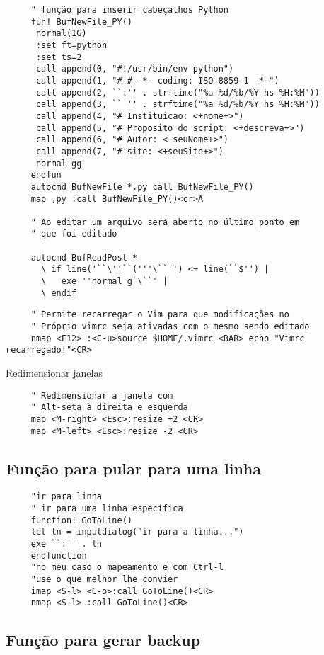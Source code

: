 \begin{verbatim}
     " função para inserir cabeçalhos Python
     fun! BufNewFile_PY()
      normal(1G)
      :set ft=python
      :set ts=2
      call append(0, "#!/usr/bin/env python")
      call append(1, "# # -*- coding: ISO-8859-1 -*-")
      call append(2, ``:'' . strftime("%a %d/%b/%Y hs %H:%M"))
      call append(3, `` '' . strftime("%a %d/%b/%Y hs %H:%M"))
      call append(4, "# Instituicao: <+nome+>")
      call append(5, "# Proposito do script: <+descreva+>")
      call append(6, "# Autor: <+seuNome+>")
      call append(7, "# site: <+seuSite+>")
      normal gg
     endfun
     autocmd BufNewFile *.py call BufNewFile_PY()
     map ,py :call BufNewFile_PY()<cr>A
   
     " Ao editar um arquivo será aberto no último ponto em
     " que foi editado
   
     autocmd BufReadPost *
       \ if line('``\''``('''\``'') <= line(``$'') |
       \   exe ''normal g`\``" |
       \ endif
\end{verbatim}

\begin{verbatim}
     " Permite recarregar o Vim para que modificações no
     " Próprio vimrc seja ativadas com o mesmo sendo editado
     nmap <F12> :<C-u>source $HOME/.vimrc <BAR> echo "Vimrc recarregado!"<CR>
\end{verbatim}

Redimensionar janelas

\begin{verbatim}
     " Redimensionar a janela com
     " Alt-seta à direita e esquerda
     map <M-right> <Esc>:resize +2 <CR>
     map <M-left> <Esc>:resize -2 <CR>
\end{verbatim}

\subsection{Função para pular para uma linha}
\label{Função para pular para uma linha}

\begin{verbatim}
     "ir para linha
     " ir para uma linha específica
     function! GoToLine()
     let ln = inputdialog("ir para a linha...")
     exe ``:'' . ln
     endfunction
     "no meu caso o mapeamento é com Ctrl-l
     "use o que melhor lhe convier
     imap <S-l> <C-o>:call GoToLine()<CR>
     nmap <S-l> :call GoToLine()<CR>
\end{verbatim}

\subsection{Função para gerar backup}
\label{Função para gerar backup}

